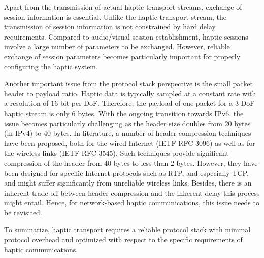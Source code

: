 \documentclass[journal]{IEEEtran}
\begin{document}
Apart from the transmission of actual haptic transport streams, exchange of session information is essential. Unlike the haptic transport stream, the transmission of session information is not constrained by hard delay requirements. Compared to audio/visual session establishment, haptic sessions involve a large number of parameters to be exchanged. However, reliable exchange of session parameters becomes particularly important for properly configuring the haptic system.

Another important issue from the protocol stack perspective is the small packet header to payload ratio. Haptic data is typically sampled at a constant rate with a resolution of $16$ bit per DoF. Therefore, the payload of one packet for a 3-DoF haptic stream is only $6$ bytes. With the ongoing transition towards IPv6, the issue becomes particularly challenging as the header size doubles from $20$ bytes (in IPv4) to $40$ bytes. In literature, a number of header compression techniques have been proposed, both for the wired Internet (IETF RFC 3096)  as well as for the wireless links (IETF RFC 3545). Such techniques provide significant compression of the header from $40$ bytes to less than $2$ bytes.  However, they have been designed for  specific Internet protocols such as RTP, and especially TCP, and might suffer significantly from unreliable wireless links. Besides, there is an inherent trade-off between header compression and the inherent delay this process might entail. Hence, for network-based haptic communications, this issue needs to be revisited.










To summarize, haptic transport requires a reliable protocol stack with minimal protocol overhead and optimized with respect to the specific requirements of haptic communications.
\end{document}
